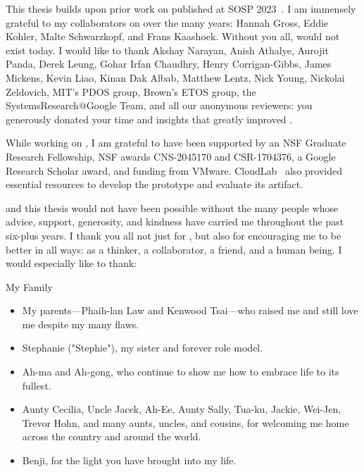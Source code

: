 %
This thesis builds upon prior work on \sys published at SOSP 2023~\cite{edna}.
I am immensely grateful to my collaborators on \sys over the many years: Hannah
Gross, Eddie Kohler, Malte Schwarzkopf, and Frans Kaashoek. Without you all,
\sys would not exist today.
%
I would like to thank Akshay Narayan, Anish Athalye, Aurojit Panda, Derek
Leung, Gohar Irfan Chaudhry, Henry Corrigan-Gibbs, James Mickens, Kevin Liao,
Kinan Dak Albab, Matthew Lentz, Nick Young, Nickolai Zeldovich, MIT's PDOS
group, Brown's ETOS group, the SystemsResearch@\-Google Team, and all our
anonymous reviewers: you generously donated your time and insights that greatly
improved \sys. 
%

%
While working on \sys, I am grateful to have been supported by an NSF Graduate
Research Fellowship, NSF awards CNS-2045170 and CSR-1704376, a Google Research
Scholar award, and funding from VMware.
%
CloudLab~\cite{cloudlab} also provided essential resources
to develop the \sys prototype and evaluate its artifact.
%

%
\sys and this thesis would not have been possible without the many people whose
advice, support, generosity, and kindness have carried me throughout the past
six-plus years.
%
I thank you all not just for \sys, but also for encouraging me to be better in
all ways: as a thinker, a collaborator, a friend, and a human being.
%
I would especially like to thank:

\begin{center}{My Family}\end{center}
    \begin{itemize}
    \item My parents---Phaih-lan Law and Kenwood Tsai---who raised me and still love me despite my many flaws. 
    
    \item Stephanie ("Stephie"), my sister and forever role model. 
     
     \item Ah-ma and Ah-gong, who continue to show me how to embrace life to its fullest. 
        
    \item Aunty Cecilia, Uncle Jacek, Ah-Ee, Aunty Sally, Tua-ku, Jackie,
        Wei-Jen, Trevor Hohn, and many aunts, uncles, and cousins, for welcoming
            me home across the country and around the world.

    \item Benji, for the light you have brought into my life.
    \end{itemize}

